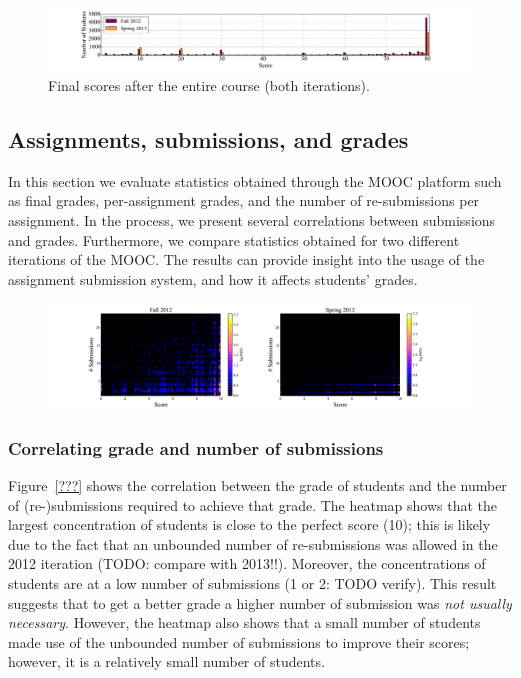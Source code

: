 \documentclass{sig-alternate}
\begin{document}
\begin{figure}[ht!]
  \centering
  \includegraphics[width=\textwidth]{plots/final-scores.pdf}
  \caption{Final scores after the entire course (both iterations).}
  \label{fig:final-scores}
\end{figure}

\subsection{Assignments, submissions, and grades}

In this section we evaluate statistics obtained through the MOOC platform such
as final grades, per-assignment grades, and the number of re-submissions per
assignment. In the process, we present several correlations between
submissions and grades. Furthermore, we compare statistics obtained for two
different iterations of the MOOC. The results can provide insight into the
usage of the assignment submission system, and how it affects students'
grades.


\begin{figure}[ht!]
  \centering
  \includegraphics[width=\textwidth]{plots/score-2d-histogram-fall2012-spring2013.pdf}
  \caption{}
  \label{fig:2d-histogram}
\end{figure}

\subsubsection{Correlating grade and number of submissions}

Figure~\ref{???} shows the correlation between the grade of students and the
number of (re-)submissions required to achieve that grade. The heatmap shows
that the largest concentration of students is close to the perfect score (10);
this is likely due to the fact that an unbounded number of re-submissions was
allowed in the 2012 iteration (TODO: compare with 2013!!). Moreover, the
concentrations of students are at a low number of submissions (1 or 2: TODO
verify). This result suggests that to get a better grade a higher number of
submission was {\em not usually necessary}. However, the heatmap also shows
that a small number of students made use of the unbounded number of
submissions to improve their scores; however, it is a relatively small number
of students.
\end{document}
